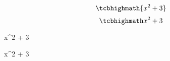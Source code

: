 \documentclass[letterpaper, 11pt, onecolumn]{article}
\begin{document}
\lipsum[1]
\lipsum[1]
\begin{equation}\tcbhighmath{x^2 + 3}\end{equation}
\lipsum[1]
\begin{equation}\eqbox{x^2 + 3}\end{equation}
\lipsum[1]
\begin{equationbox}x^2 + 3\end{equationbox}
\lipsum[1]
\begin{equationbox*}x^2 + 3\end{equationbox*}
\lipsum[1]
\end{document}

